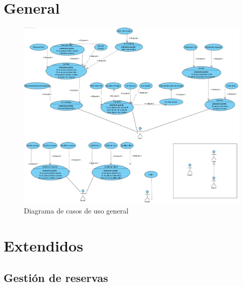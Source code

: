 \documentclass{report}
\begin{document}
        \section{General}
            \begin{figure}[H]
                \centering
                \includegraphics[scale=0.3]{img/casos_uso/General.png}
                \caption{Diagrama de casos de uso general}
            \end{figure}
        \clearpage
        \section{Extendidos}
        \subsection{Gestión de reservas}
        \clearpage
\end{document}
